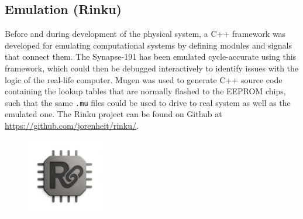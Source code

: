 \subsection{Emulation (Rinku)}
Before and during development of the physical system, a C++ framework was developed for emulating computational systems by defining modules and signals that connect them. The Synapse-191 has been emulated cycle-accurate using this framework, which could then be debugged interactively to identify issues with the logic of the real-life computer. Mugen was used to generate C++ source code containing the lookup tables that are normally flashed to the EEPROM chips, such that the same \texttt{.mu} files could be used to drive to real system as well as the emulated one. The Rinku project can be found on Github at \url{https://github.com/jorenheit/rinku/}.

\begin{figure}[H]
  \centering
  \includegraphics[width=0.3\textwidth]{img/rinku_logo}
\end{figure}
